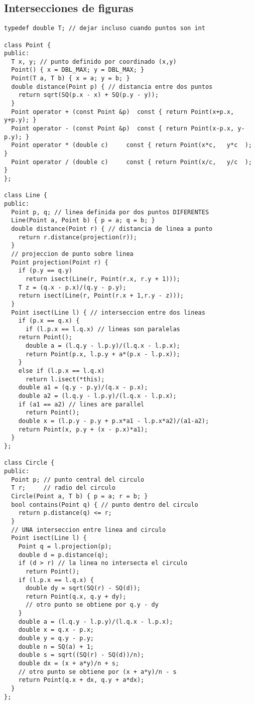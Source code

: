\documentclass[10pt, a4, oneside]{article}
\begin{document}
\subsection{Intersecciones de figuras}
\begin{verbatim}
typedef double T; // dejar incluso cuando puntos son int

class Point {
public:
  T x, y; // punto definido por coordinado (x,y)
  Point() { x = DBL_MAX; y = DBL_MAX; }
  Point(T a, T b) { x = a; y = b; }
  double distance(Point p) { // distancia entre dos puntos
    return sqrt(SQ(p.x - x) + SQ(p.y - y));
  }
  Point operator + (const Point &p)  const { return Point(x+p.x, y+p.y); }
  Point operator - (const Point &p)  const { return Point(x-p.x, y-p.y); }
  Point operator * (double c)     const { return Point(x*c,   y*c  ); }
  Point operator / (double c)     const { return Point(x/c,   y/c  ); }
};

class Line {
public:
  Point p, q; // linea definida por dos puntos DIFERENTES
  Line(Point a, Point b) { p = a; q = b; }
  double distance(Point r) { // distancia de linea a punto
    return r.distance(projection(r));
  }
  // projeccion de punto sobre linea
  Point projection(Point r) {
    if (p.y == q.y)
      return isect(Line(r, Point(r.x, r.y + 1)));
    T z = (q.x - p.x)/(q.y - p.y);
    return isect(Line(r, Point(r.x + 1,r.y - z)));
  }
  Point isect(Line l) { // interseccion entre dos lineas
    if (p.x == q.x) {
      if (l.p.x == l.q.x) // lineas son paralelas
    return Point();
      double a = (l.q.y - l.p.y)/(l.q.x - l.p.x);
      return Point(p.x, l.p.y + a*(p.x - l.p.x));
    }
    else if (l.p.x == l.q.x)
      return l.isect(*this);
    double a1 = (q.y - p.y)/(q.x - p.x);
    double a2 = (l.q.y - l.p.y)/(l.q.x - l.p.x);
    if (a1 == a2) // lines are parallel
      return Point();
    double x = (l.p.y - p.y + p.x*a1 - l.p.x*a2)/(a1-a2);
    return Point(x, p.y + (x - p.x)*a1);
  }
};

class Circle {
public:
  Point p; // punto central del circulo
  T r;     // radio del circulo
  Circle(Point a, T b) { p = a; r = b; }
  bool contains(Point q) { // punto dentro del circulo
    return p.distance(q) <= r;
  }
  // UNA interseccion entre linea and circulo
  Point isect(Line l) {
    Point q = l.projection(p);
    double d = p.distance(q);
    if (d > r) // la linea no intersecta el circulo
      return Point();
    if (l.p.x == l.q.x) {
      double dy = sqrt(SQ(r) - SQ(d));
      return Point(q.x, q.y + dy);
      // otro punto se obtiene por q.y - dy
    }
    double a = (l.q.y - l.p.y)/(l.q.x - l.p.x);
    double x = q.x - p.x;
    double y = q.y - p.y;
    double n = SQ(a) + 1;
    double s = sqrt((SQ(r) - SQ(d))/n);
    double dx = (x + a*y)/n + s;
    // otro punto se obtiene por (x + a*y)/n - s
    return Point(q.x + dx, q.y + a*dx);
  }
};


\end{verbatim}
\end{document}
